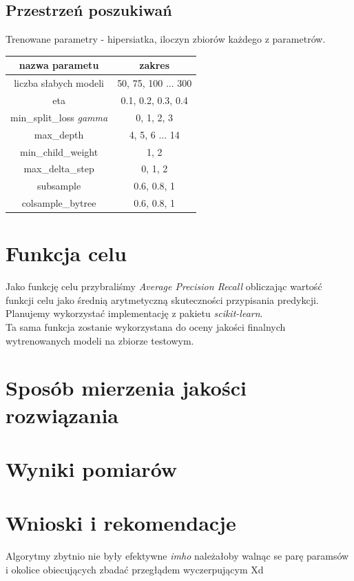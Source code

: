 \documentclass[11pt]{article}
\begin{document}
\subsection{Przestrzeń poszukiwań}
Trenowane parametry - hipersiatka, iloczyn zbiorów każdego z parametrów.
\begin{center}
	\begin{tabular}{|c|c|}
		\hline
		nazwa parametu & zakres \\
		\hline
		\hline
		liczba słabych modeli &  50, 75, 100 ... 300\\ %
		\hline
		eta &  0.1, 0.2, 0.3, 0.4\\ %
		\hline 
		min\_split\_loss \textit{gamma} & 0, 1, 2, 3\\ %
		\hline 
		max\_depth & 4, 5, 6 ... 14\\
	    \hline
		min\_child\_weight & 1, 2\\
		\hline 
		max\_delta\_step & 0, 1, 2\\
		\hline 
		subsample & 0.6, 0.8, 1\\
		\hline
		colsample\_bytree &  0.6, 0.8, 1\\ %
		\hline 
	\end{tabular}
\end{center}                         




\section{Funkcja celu}
Jako funkcję celu przybraliśmy \textit{Average Precision Recall} obliczając wartość funkcji celu jako średnią arytmetyczną skuteczności przypisania predykcji. Planujemy wykorzystać implementację z pakietu \textit{scikit-learn}.\\
Ta sama funkcja zostanie wykorzystana do oceny jakości finalnych wytrenowanych modeli na zbiorze testowym.

\section{Sposób mierzenia jakości rozwiązania}

\section{Wyniki pomiarów}



\section{Wnioski i rekomendacje}
Algorytmy zbytnio nie były efektywne \textit{imho} należałoby walnąc se parę paramsów i okolice obiecujących zbadać przegłądem wyczerpującym Xd
\end{document}
